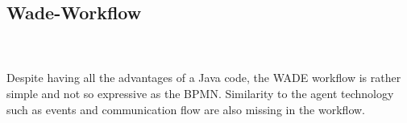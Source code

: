 \subsection{Wade-Workflow}
\\\\
Despite having all the advantages of a Java code, the WADE workflow is rather simple and not so expressive as the BPMN. Similarity to the agent technology such as events and communication flow are also missing in the workflow. 